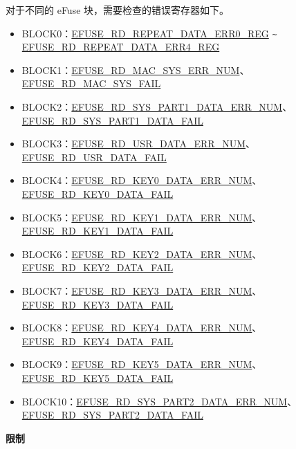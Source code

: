 \documentclass[main\_\_CN.tex]{subfiles}
\begin{document}
\begin{enumerate}
对于不同的 eFuse 块，需要检查的错误寄存器如下。
\begin{itemize}
    \item BLOCK0：\hyperref[regdesc:EFUSERDREPEATDATAERR0REG]{EFUSE\_RD\_REPEAT\_DATA\_ERR0\_REG} \verb+~+ \hyperref[regdesc:EFUSERDREPEATDATAERR4REG]{EFUSE\_RD\_REPEAT\_DATA\_ERR4\_REG}
    \item BLOCK1：\hyperref[fielddesc:EFUSERDMACSYSERRNUM]{EFUSE\_RD\_MAC\_SYS\_ERR\_NUM}、\hyperref[fielddesc:EFUSERDMACSYSFAIL]{EFUSE\_RD\_MAC\_SYS\_FAIL}
    \item BLOCK2：\hyperref[fielddesc:EFUSERDSYSPART1DATAERRNUM]{EFUSE\_RD\_SYS\_PART1\_DATA\_ERR\_NUM}、\hyperref[fielddesc:EFUSERDSYSPART1DATAFAIL]{EFUSE\_RD\_SYS\_PART1\_DATA\_FAIL}
    \item BLOCK3：\hyperref[fielddesc:EFUSERDUSRDATAERRNUM]{EFUSE\_RD\_USR\_DATA\_ERR\_NUM}、\hyperref[fielddesc:EFUSERDUSRDATAFAIL]{EFUSE\_RD\_USR\_DATA\_FAIL}
    \item BLOCK4：\hyperref[fielddesc:EFUSERDKEY0DATAERRNUM]{EFUSE\_RD\_KEY0\_DATA\_ERR\_NUM}、\hyperref[fielddesc:EFUSERDKEY0DATAFAIL]{EFUSE\_RD\_KEY0\_DATA\_FAIL}
    \item BLOCK5：\hyperref[fielddesc:EFUSERDKEY1DATAERRNUM]{EFUSE\_RD\_KEY1\_DATA\_ERR\_NUM}、\hyperref[fielddesc:EFUSERDKEY1DATAFAIL]{EFUSE\_RD\_KEY1\_DATA\_FAIL}
    \item BLOCK6：\hyperref[fielddesc:EFUSERDKEY2DATAERRNUM]{EFUSE\_RD\_KEY2\_DATA\_ERR\_NUM}、\hyperref[fielddesc:EFUSERDKEY2DATAFAIL]{EFUSE\_RD\_KEY2\_DATA\_FAIL}
    \item BLOCK7：\hyperref[fielddesc:EFUSERDKEY3DATAERRNUM]{EFUSE\_RD\_KEY3\_DATA\_ERR\_NUM}、\hyperref[fielddesc:EFUSERDKEY3DATAFAIL]{EFUSE\_RD\_KEY3\_DATA\_FAIL}
    \item BLOCK8：\hyperref[fielddesc:EFUSERDKEY4DATAERRNUM]{EFUSE\_RD\_KEY4\_DATA\_ERR\_NUM}、\hyperref[fielddesc:EFUSERDKEY4DATAFAIL]{EFUSE\_RD\_KEY4\_DATA\_FAIL}
    \item BLOCK9：\hyperref[fielddesc:EFUSERDKEY5DATAERRNUM]{EFUSE\_RD\_KEY5\_DATA\_ERR\_NUM}、\hyperref[fielddesc:EFUSERDKEY5DATAFAIL]{EFUSE\_RD\_KEY5\_DATA\_FAIL}
    \item BLOCK10：\hyperref[fielddesc:EFUSERDSYSPART2DATAERRNUM]{EFUSE\_RD\_SYS\_PART2\_DATA\_ERR\_NUM}、\hyperref[fielddesc:EFUSERDSYSPART2DATAFAIL]{EFUSE\_RD\_SYS\_PART2\_DATA\_FAIL}
\end{itemize}
\end{enumerate}


{\bfseries 限制}
\end{document}
